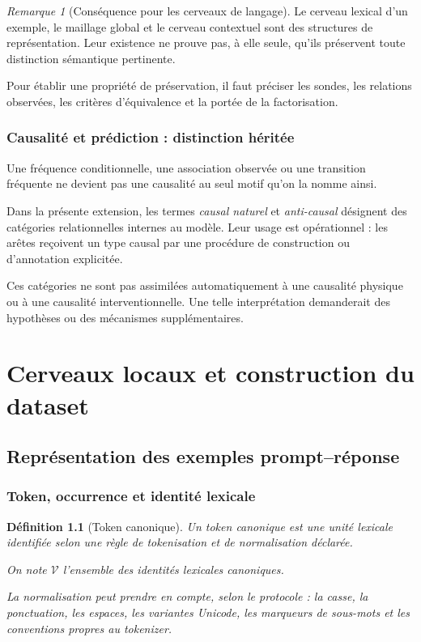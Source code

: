 \documentclass[11pt,a4paper,oneside]{book}
\newtheorem{definition}{Définition}[chapter]
\theoremstyle{remark}
\newtheorem{remarque}[definition]{Remarque}
\newcommand{\Tokens}{\mathcal{V}}
\begin{document}
\begin{remarque}[Conséquence pour les cerveaux de langage]
Le cerveau lexical d'un exemple, le maillage global et le cerveau
contextuel sont des structures de représentation. Leur existence ne
prouve pas, à elle seule, qu'ils préservent toute distinction
sémantique pertinente.

Pour établir une propriété de préservation, il faut préciser les
sondes, les relations observées, les critères d'équivalence et la
portée de la factorisation.
\end{remarque}

\section{Causalité et prédiction : distinction héritée}

Une fréquence conditionnelle, une association observée ou une
transition fréquente ne devient pas une causalité au seul motif
qu'on la nomme ainsi.

Dans la présente extension, les termes \emph{causal naturel} et
\emph{anti-causal} désignent des catégories relationnelles internes
au modèle. Leur usage est opérationnel : les arêtes reçoivent un type
causal par une procédure de construction ou d'annotation explicitée.

Ces catégories ne sont pas assimilées automatiquement à une causalité
physique ou à une causalité interventionnelle. Une telle interprétation
demanderait des hypothèses ou des mécanismes supplémentaires.


\part{Cerveaux locaux et construction du dataset}

\chapter{Représentation des exemples prompt--réponse}

\section{Token, occurrence et identité lexicale}

\begin{definition}[Token canonique]
Un token canonique est une unité lexicale identifiée selon une règle
de tokenisation et de normalisation déclarée.

On note \(\Tokens\) l'ensemble des identités lexicales canoniques.

La normalisation peut prendre en compte, selon le protocole :
la casse, la ponctuation, les espaces, les variantes Unicode, les
marqueurs de sous-mots et les conventions propres au tokenizer.
\end{definition}
\end{document}
